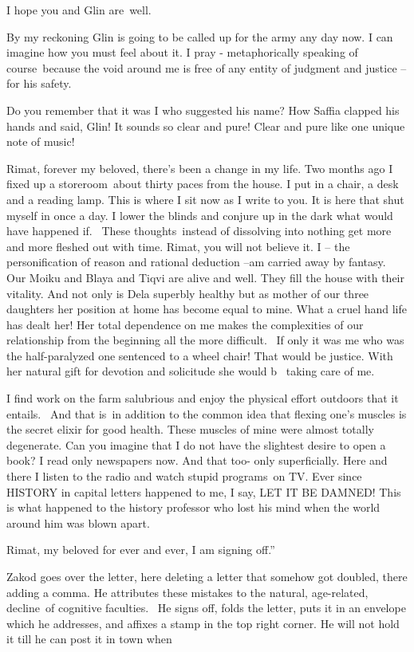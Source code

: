 \documentclass[letterpaper]{article}
\begin{document}
I hope you and Glin are~well.

By my reckoning Glin is going to be called up for the army any day now. I can imagine how you must feel about it. I pray
- metaphorically speaking of course~because the void around me is free of any entity of judgment and justice -- for his
safety.

Do you remember that it was I who suggested his name? How Saffia clapped his hands and said, {\textquotedbl}Glin! It
sounds so clear and pure! Clear and pure like one unique {note of music}!{\textquotedbl}

Rimat, forever my beloved, there's been a change in my life. Two months ago I fixed up a storeroom~about thirty paces
from the house. I put in a chair, a desk and a reading lamp. This is where I sit now as I write to you. It is here that
shut myself in once a day. I lower the blinds and conjure up in the dark what would have happened
{\textquotedbl}if{\textquotedbl}.~ These thoughts~instead of dissolving into nothing get more and more fleshed out with
time. Rimat, you will not believe it. I -- the personification of reason and rational deduction --am carried away by
fantasy.~ Our Moiku and Blaya and Tiqvi are alive and well. They fill the house with their vitality. And not only is
Dela superbly healthy but as mother of our three daughters her position at home has become equal to mine. What a cruel
hand life has dealt her! Her total dependence on me makes the complexities of our relationship from the beginning all
the more difficult. \ If only it was me who was the half-paralyzed one sentenced to a wheel chair! That would be
justice. With her natural gift for devotion and solicitude she would b \ taking care of me.~ 

I find work on the farm salubrious and enjoy the physical effort outdoors that it entails.~ And that is~in addition to
the common idea that flexing one's muscles is the secret elixir for good health. These muscles of mine were almost
totally degenerate. Can you imagine that I do not have the slightest desire to open a book? I read only newspapers now.
And that too- only superficially. Here and there I listen to the radio and watch stupid programs~on TV. Ever since
HISTORY in capital letters happened to me, I say, LET IT BE DAMNED! This is what happened to the history professor who
lost his mind when the world around him was blown apart.

Rimat, my beloved for ever and ever, I am signing off.''

Zakod goes over the letter, here deleting a letter that somehow got doubled, there adding a comma. He attributes these
mistakes to the natural, age-related, decline~of cognitive faculties. \ He signs off, folds the letter, puts it in an
envelope which he addresses, and affixes a stamp in the top right corner. He will not hold it till he can post it in
town when 
\end{document}
